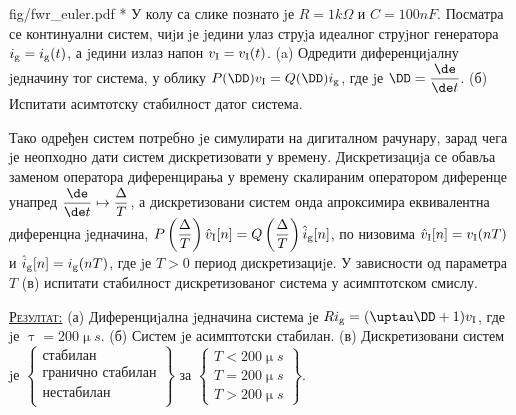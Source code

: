 \begin{slikaDesno}{fig/fwr_euler.pdf}    
    {\color{red}*}\PID 
    У колу са слике познато jе $R = 1\unit{k\Omega}$ и 
    $C = 100\unit{nF}$. Посматра се континуални систем, чиjи jе jедини улаз струjа идеалног струjног генератора
    $i_{\rm g} = i_{\rm g}(t)$, а jедини излаз напон $v_{\rm I} = v_{\rm I} (t)$.
    (a) Одредити диференциjалну jедначину тог система, у облику 
    $P(\DD) v_{\rm I} = Q(\DD) i_{\rm g}$, где jе $\DD = \dfrac{\de}{\de t}$.
    (б) Испитати асимтотску стабилност датог система. 
\end{slikaDesno}
Тако одређен систем потребно jе симулирати на дигиталном рачунару,
зарад чега jе неопходно дати систем дискретизовати у времену. Дискретизациjа
се обавља заменом оператора диференцирања у времену скалираним оператором
диференце унапред 
$\dfrac{\de}{\de  t} \mapsto \dfrac{\Delta}{T}$, 
а дискретизовани систем онда апроксимира еквивалентна диференцна jедначина, 
$P\left( 
    \dfrac{\Delta}{T}
\right) \hat v_{\rm I}[n] 
=
Q\left( 
    \dfrac{\Delta}{T}
\right) \hat i_{\rm g}[n]$, 
по низовима $\hat v_{\rm I}[n] = v_{\rm I}(nT)$ и $\hat i_{\rm g}[n] = i_{\rm g}(nT)$, где jе $T > 0$ 
период дискретизациjе. У зависности од параметра $T$ (в)
испитати стабилност дискретизованог система у асимптотском смислу. 
\vspace*{2mm}

\textsc{\underline{Резултат:}}
(а) Диференциjална jедначина система jе $R i_{\rm g} = (\uptau \DD + 1) v_{\rm I}$, где jе 
$\uptau = 200\unit{\upmu s}$.
(б) Систем jе асимптотски стабилан.
(в) 
Дискретизовани систем jе
$
\left\{
\begin{matrix}
    \text{стабилан} \\
    \text{гранично стабилан} \\
    \text{нестабилан} \\
\end{matrix}
\right\}
$ 
за
$
\left\{
\begin{matrix}
    T < 200\unit{\upmu s} \\
    T = 200\unit{\upmu s} \\
    T > 200\unit{\upmu s}
\end{matrix}
\right\}
$.

